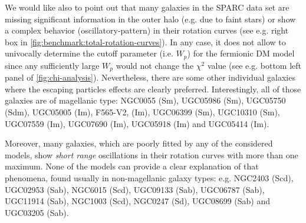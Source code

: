 
We would like also to point out that many galaxies in the SPARC data set are missing significant information in the outer halo (e.g. due to faint stars) or show a complex behavior (oscillatory-pattern) in their rotation curves (see e.g. right box in \cref{fig:benchmark:total-rotation-curves}). In any case, it does not allow to univocally determine the cutoff parameter (i.e. $W_p$) for the fermionic DM model since any sufficiently large $W_p$ would not change the $\chi^2$ value (see e.g. bottom left panel of \cref{fig:chi-analysis}). Nevertheless, there are some other individual galaxies where the escaping particles effects are clearly preferred. Interestingly, all of those galaxies are of magellanic type: NGC0055 (Sm), UGC05986 (Sm), UGC05750 (Sdm), UGC05005 (Im), F565-V2, (Im), UGC06399 (Sm), UGC10310 (Sm), UGC07559 (Im), UGC07690 (Im), UGC05918 (Im) and UGC05414 (Im).

Moreover, many galaxies, which are poorly fitted by any of the considered models, show \textit{short range} oscillations in their rotation curves with more than one maximum. None of the models can provide a clear explanation of that phenomena, found usually in non-magellanic galaxy types: e.g. NGC2403 (Scd), UGC02953 (Sab), NGC6015 (Scd), UGC09133 (Sab), UGC06787 (Sab), UGC11914 (Sab), NGC1003 (Scd), NGC0247 (Sd), UGC08699 (Sab) and UGC03205 (Sab).


